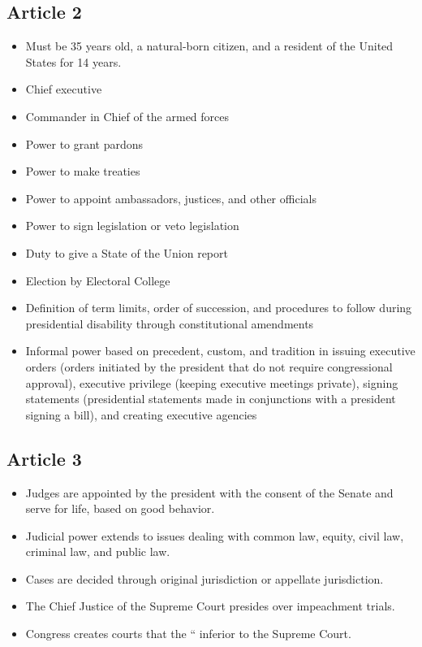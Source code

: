 \documentclass[12pt]{article}
\begin{document}
\subsection*{Article 2}
	\begin{itemize}
		\item Must be 35 years old, a natural-born citizen, and a resident of the United States for 14 years.
		\item Chief executive
		\item Commander in Chief of the armed forces
		\item Power to grant pardons
		\item Power to make treaties
		\item Power to appoint ambassadors, justices, and other officials
		\item Power to sign legislation or veto legislation
		\item Duty to give a State of the Union report
		\item Election by Electoral College
		\item Definition of term limits, order of succession, and procedures to follow during presidential disability through constitutional amendments
		\item Informal power based on precedent, custom, and tradition in issuing executive orders (orders initiated by the president that do not require congressional approval), executive privilege (keeping executive meetings private), signing statements (presidential statements made in conjunctions with a president signing a bill), and creating executive agencies
	\end{itemize}

\subsection*{Article 3}
	\begin{itemize}
		\item Judges are appointed by the president with the consent of the Senate and serve for life, based on good behavior.
		\item Judicial power extends to issues dealing with common law, equity, civil law, criminal law, and public law.
		\item Cases are decided through original jurisdiction or appellate jurisdiction.
		\item The Chief Justice of the Supreme Court presides over impeachment trials.
		\item Congress creates courts that the `` inferior to the Supreme Court.
	\end{itemize}
\end{document}
